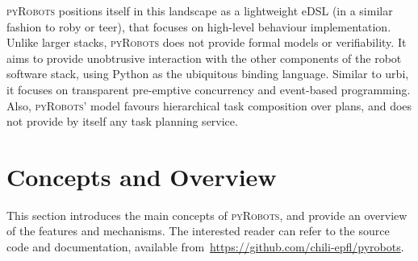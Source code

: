 \documentclass[letterpaper, 10pt, conference]{ieeeconf}      %
\newcommand{\pyRobots}{\textsc{pyRobots}}
\begin{document}
\pyRobots{} positions itself in this landscape as a lightweight eDSL (in a
similar fashion to {\sc roby} or {\sc teer}), that focuses on high-level
behaviour implementation. Unlike larger stacks, \pyRobots{} does not provide
formal models or verifiability. It aims to provide unobtrusive interaction with
the other components of the robot software stack, using Python as the ubiquitous
binding language. Similar to {\sc urbi}, it focuses on transparent pre-emptive
concurrency and event-based programming.  Also, \pyRobots{}' model favours
hierarchical task composition over plans, and does not provide by itself any
task planning service.

%
%
%
%
%
\section{Concepts and Overview}

This section introduces the main concepts of \pyRobots{}, and provide an
overview of the features and mechanisms. The interested reader can refer to
the source code and documentation, available
from~\url{https://github.com/chili-epfl/pyrobots}.
\end{document}
